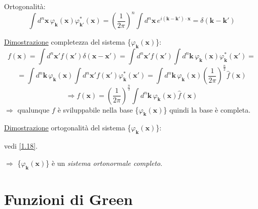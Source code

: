 \documentclass[a4paper,11pt]{report}
\newcommand{\x}{\boldsymbol{x}}
\newcommand{\xp}{\boldsymbol{x}'}
\newcommand{\kk}{\boldsymbol{k}}
\newcommand{\kp}{\boldsymbol{k}'}
\begin{document}
Ortogonalit\`a:
\begin{equation}
\int d^n\x\,\varphi_{\kk}(\x)\varphi_{\kp}^{*}(\x)=\left(\frac{1}{2\pi}\right)^{n}\int d^n\x\, e^{i(\kk-\kp)\cdot\x}=\delta (\kk-\kp)
\label{1.18}
\end{equation}

\underline{Dimostrazione} completezza del sistema \{$\varphi_{\kk}(\x)$\}:
\[
f(\x)=\int d^n\xp f(\xp)\delta(\x-\xp)=
\int d^n\xp f(\xp)\int d^n\kk\,\varphi_{\kk}(\x)\varphi_{\kk}^{*}(\xp)=
\]
\[
=\int d^n\kk\,\varphi_{\kk}(\x)\int d^n\xp f(\xp)\varphi_{\kk}^{*}(\xp)=
\int d^n\kk\,\varphi_{\kk}(\x)\left(\frac{1}{2\pi}\right)^{\frac{n}{2}}\hat{f}(\x)
\]
\[
\Rightarrow f(\x)=\left(\frac{1}{2\pi}\right)^{\frac{n}{2}}\int d^n\kk\,\varphi_{\kk}(\x)\hat{f}(\x)
\]
$\Rightarrow$ qualunque $f$ \`e sviluppabile nella base \{$\varphi_{\kk}(\x)$\} quindi la base \`e completa.

\medskip

\underline{Dimostrazione} ortogonalit\`a del sistema \{$\varphi_{\kk}(\x)$\}:

vedi \eqref{1.18}.

\medskip

$\Rightarrow$ \{$\varphi_{\kk}(\x)$\} \`e un \emph{sistema ortonormale completo}.

\section{Funzioni di Green}
\end{document}
